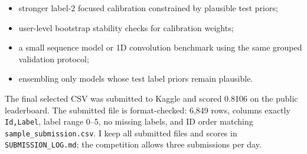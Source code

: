 \documentclass[11pt]{article}
\begin{document}
\begin{itemize}[leftmargin=*]
    \item stronger label-2 focused calibration constrained by plausible test priors;
    \item user-level bootstrap stability checks for calibration weights;
    \item a small sequence model or 1D convolution benchmark using the same
    grouped validation protocol;
    \item ensembling only models whose test label priors remain plausible.
\end{itemize}

The final selected CSV was submitted to Kaggle and scored 0.8106 on the public
leaderboard. The submitted file is format-checked: 6,849 rows, columns exactly
\texttt{Id,Label}, label range 0--5, no missing labels, and ID order matching
\texttt{sample\_submission.csv}. I keep all submitted files and scores in
\texttt{SUBMISSION\_LOG.md}; the competition allows three submissions per day.
\end{document}
